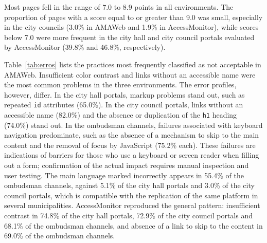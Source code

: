 \documentclass[12pt]{article}
\begin{document}
Most pages fell in the range of 7.0 to 8.9 points in all environments. The proportion of pages with a score equal to or greater than 9.0 was small, especially in the city councils (3.0\% in AMAWeb and 1.9\% in AccessMonitor), while scores below 7.0 were more frequent in the city hall and city council portals evaluated by AccessMonitor (39.8\% and 46.8\%, respectively).

Table~\ref{tab:erros} lists the practices most frequently classified as not acceptable in AMAWeb. Insufficient color contrast and links without an accessible name were the most common problems in the three environments. The error profiles, however, differ. In the city hall portals, markup problems stand out, such as repeated \texttt{id} attributes (65.0\%). In the city council portals, links without an accessible name (82.0\%) and the absence or duplication of the \texttt{h1} heading (74.0\%) stand out. In the ombudsman channels, failures associated with keyboard navigation predominate, such as the absence of a mechanism to skip to the main content and the removal of focus by JavaScript (75.2\% each). These failures are indications of barriers for those who use a keyboard or screen reader when filling out a form; confirmation of the actual impact requires manual inspection and user testing. The main language marked incorrectly appears in 55.4\% of the ombudsman channels, against 5.1\% of the city hall portals and 3.0\% of the city council portals, which is compatible with the replication of the same platform in several municipalities. AccessMonitor reproduced the general pattern: insufficient contrast in 74.8\% of the city hall portals, 72.9\% of the city council portals and 68.1\% of the ombudsman channels, and absence of a link to skip to the content in 69.0\% of the ombudsman channels.
\end{document}
